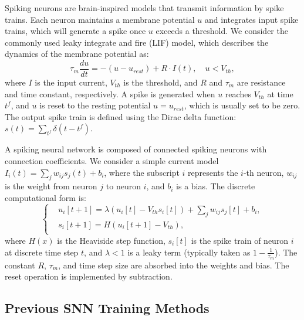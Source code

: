 \documentclass{article}
\begin{document}
Spiking neurons are brain-inspired models that transmit information by spike trains. Each neuron maintains a membrane potential $u$ and integrates input spike trains, which will generate a spike once $u$ exceeds a threshold. We consider the commonly used leaky integrate and fire (LIF) model, which describes the dynamics of the membrane potential as:
\vspace{-1mm}
\begin{equation}\label{eq.origin}
    \tau_m\frac{du}{dt} = -(u-u_{rest}) + R\cdot I(t),\quad u < V_{th},
\end{equation}
where $I$ is the input current, $V_{th}$ is the threshold, and $R$ and $\tau_m$ are resistance and time constant, respectively. 
A spike is generated when $u$ reaches $V_{th}$ at time $t^f$, and $u$ is reset to the resting potential $u=u_{rest}$, which is usually set to be zero. The output spike train is defined using the Dirac delta function: $s(t) = \sum_{t^f}\delta(t-t^f)$. 

A spiking neural network is composed of connected spiking neurons with connection coefficients. We consider a simple current model $I_i(t)=\sum_j w_{ij}s_j(t) +b_i$, where the subscript $i$ represents the $i$-th neuron, $w_{ij}$ is the weight from neuron $j$ to neuron $i$, and $b_i$ is a bias. The discrete computational form is: 
\vspace{-2mm}
\begin{equation}
    \left\{
    \begin{aligned}
        &u_i\left[t + 1\right] = \lambda (u_i[t] - V_{th}s_i[t]) + \sum_j w_{ij}s_j[t] + b_i,\\
        &s_i[t + 1] = H(u_i\left[t+1\right] - V_{th}),\\
    \end{aligned}
    \right.
    \label{eq.discrete}
\end{equation}
where $H(x)$ is the Heaviside step function,  $s_i[t]$ is the spike train of neuron $i$ at discrete time step $t$, and $\lambda<1$ is a leaky term (typically taken as $1-\frac{1}{\tau_m}$). The constant $R$, $\tau_m$, and time step size are absorbed into the weights and bias. The reset operation is implemented by subtraction. 

\subsection{Previous SNN Training Methods}\label{previous training methods}
\vspace{-2mm}
\end{document}
